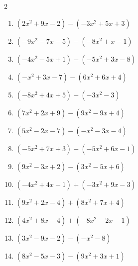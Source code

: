 \begin{multicols}{2}
\begin{enumerate}
  \item $(2x^{2}+9x-2)-(-3x^{2}+5x+3)$


  \item $(-9x^{2}-7x-5)-(-8x^{2}+x-1)$


  \item $(-4x^{2}-5x+1)-(-5x^{2}+3x-8)$


  \item $(-x^{2}+3x-7)-(6x^{2}+6x+4)$


  \item $(-8x^{2}+4x+5)-(-3x^{2}-3)$


  \item $(7x^{2}+2x+9)-(9x^{2}-9x+4)$


  \item $(5x^{2}-2x-7)-(-x^{2}-3x-4)$


  \item $(-5x^{2}+7x+3)-(-5x^{2}+6x-1)$

        \phantom{$=x+4$}

  \item $(9x^{2}-3x+2)-(3x^{2}-5x+6)$


  \item $(-4x^{2}+4x-1)+(-3x^{2}+9x-3)$


  \item $(9x^{2}+2x-4)+(8x^{2}+7x+4)$


  \item $(4x^{2}+8x-4)+(-8x^{2}-2x-1)$


  \item $(3x^{2}-9x-2)-(-x^{2}-8)$


  \item $(8x^{2}-5x-3)-(9x^{2}+3x+1)$


\end{enumerate}
\end{multicols}

